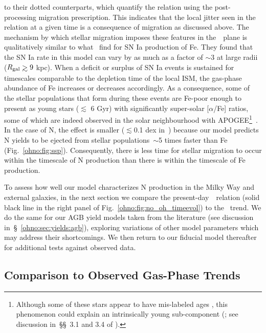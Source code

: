 to their dotted counterparts, which quantify the relation using the
post-processing migration prescription.
This indicates that the local jitter seen in the relation at a given time is
a consequence of migration as discussed above.
The mechanism by which stellar migration imposes these features in
the~\ohno~plane is qualitatively similar to what~\citet{Johnson2021} find for
SN Ia production of Fe.
They found that the SN Ia rate in this model can vary by as much as a factor of
$\sim$3 at large radii ($\rgal \gtrsim 9$ kpc).
When a deficit or surplus of SN Ia events is sustained for timescales
comparable to the depletion time of the local ISM, the gas-phase abundance of
Fe increases or decreases accordingly.
As a consequence, some of the stellar populations that form during these
events are Fe-poor enough to present as young stars ($\lesssim$ 6 Gyr) with
significantly super-solar [$\alpha$/Fe] ratios, some of which are indeed
observed in the solar neighbourhood with APOGEE\footnote{
	Although some of these stars appear to have mis-labeled ages
	\citep{Jofre2016, Yong2016, Izzard2018, SilvaAguirre2018, Miglio2021}, this
	phenomenon could explain an intrinsically young sub-component
	(\citealp{Hekker2019}; see discussion in~\S\S~3.1 and 3.4 of
	\citealp{Johnson2021}).
}~\citep{Chiappini2015, Martig2015, Martig2016, Warfield2021}.
In the case of N, the effect is smaller ($\lesssim$0.1 dex in~\no) because our
model predicts N yields to be ejected from stellar populations~$\sim$5
times faster than Fe (Fig.~\ref{ohno:fig:ssp}).
Consequently, there is less time for stellar migration to occur within the
timescale of N production than there is within the timescale of Fe production.
\par
To assess how well our model characterizes N production in the Milky Way and
external galaxies, in the next section we compare the
present-day~\ohno~relation (solid black line in the right panel of
Fig.~\ref{ohno:fig:no_oh_timeevol}) to the~\citet{Dopita2016} trend.
We do the same for our AGB yield models taken from the literature
(see discussion in~\S~\ref{ohno:sec:yields:agb}), exploring variations of other
model parameters which may address their shortcomings.
We then return to our fiducial model thereafter for additional tests against
observed data.


\subsection{Comparison to Observed Gas-Phase Trends}
\label{ohno:sec:results:yields}

